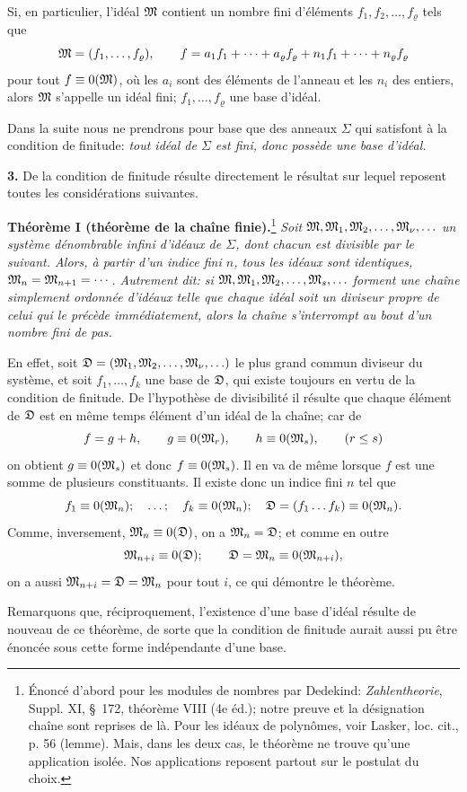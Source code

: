 Si, en particulier, l'idéal $\mathfrak{M}$ contient un nombre fini d'éléments $f_1,f_2,\ldots,f_\varrho$ tels que
\[
 \mathfrak{M}=(f_1,\ldots,f_\varrho),\qquad
 f=a_1f_1+\cdots+a_\varrho f_\varrho+n_1f_1+\cdots+n_\varrho f_\varrho
\]
pour tout $f\equiv0(\mathfrak{M})$, où les $a_i$ sont des éléments de l'anneau et les $n_i$ des entiers, alors $\mathfrak{M}$ s'appelle un idéal fini; $f_1,\ldots,f_\varrho$ une base d'idéal.

Dans la suite nous ne prendrons pour base que des anneaux $\Sigma$ qui satisfont à la condition de finitude: \emph{tout idéal de $\Sigma$ est fini, donc possède une base d'idéal.}

\textbf{3.} De la condition de finitude résulte directement le résultat sur lequel reposent toutes les considérations suivantes.

\textbf{Théorème I (théorème de la chaîne finie).}\footnote{Énoncé d'abord pour les modules de nombres par Dedekind: \emph{Zahlentheorie}, Suppl. XI, \S~172, théorème VIII (4e éd.); notre preuve et la désignation \og{} chaîne \fg{} sont reprises de là. Pour les idéaux de polynômes, voir Lasker, loc. cit., p. 56 (lemme). Mais, dans les deux cas, le théorème ne trouve qu'une application isolée. Nos applications reposent partout sur le postulat du choix.} \emph{Soit $\mathfrak{M},\mathfrak{M}_1,\mathfrak{M}_2,\ldots,\mathfrak{M}_\nu,\ldots$ un système dénombrable infini d'idéaux de $\Sigma$, dont chacun est divisible par le suivant. Alors, à partir d'un indice fini $n$, tous les idéaux sont identiques, $\mathfrak{M}_n=\mathfrak{M}_{n+1}=\cdots$. Autrement dit: si $\mathfrak{M},\mathfrak{M}_1,\mathfrak{M}_2,\ldots,\mathfrak{M}_s,\ldots$ forment une chaîne simplement ordonnée d'idéaux telle que chaque idéal soit un diviseur propre de celui qui le précède immédiatement, alors la chaîne s'interrompt au bout d'un nombre fini de pas.}

En effet, soit $\mathfrak{D}=(\mathfrak{M}_1,\mathfrak{M}_2,\ldots,\mathfrak{M}_\nu,\ldots)$ le plus grand commun diviseur du système, et soit $f_1,\ldots,f_k$ une base de $\mathfrak{D}$, qui existe toujours en vertu de la condition de finitude. De l'hypothèse de divisibilité il résulte que chaque élément de $\mathfrak{D}$ est en même temps élément d'un idéal de la chaîne; car de
\[
 f=g+h,\qquad g\equiv0(\mathfrak{M}_r),\qquad h\equiv0(\mathfrak{M}_s),\qquad (r\le s)
\]
on obtient $g\equiv0(\mathfrak{M}_s)$ et donc $f\equiv0(\mathfrak{M}_s)$. Il en va de même lorsque $f$ est une somme de plusieurs constituants. Il existe donc un indice fini $n$ tel que
\[
 f_1\equiv0(\mathfrak{M}_n);\quad\ldots;\quad f_k\equiv0(\mathfrak{M}_n);\quad
 \mathfrak{D}=(f_1\ldots f_k)\equiv0(\mathfrak{M}_n).
\]
Comme, inversement, $\mathfrak{M}_n\equiv0(\mathfrak{D})$, on a $\mathfrak{M}_n=\mathfrak{D}$; et comme en outre
\[
 \mathfrak{M}_{n+i}\equiv0(\mathfrak{D});\qquad
 \mathfrak{D}=\mathfrak{M}_n\equiv0(\mathfrak{M}_{n+i}),
\]
on a aussi $\mathfrak{M}_{n+i}=\mathfrak{D}=\mathfrak{M}_n$ pour tout $i$, ce qui démontre le théorème.

Remarquons que, réciproquement, l'existence d'une base d'idéal résulte de nouveau de ce théorème, de sorte que la condition de finitude aurait aussi pu être énoncée sous cette forme indépendante d'une base.
